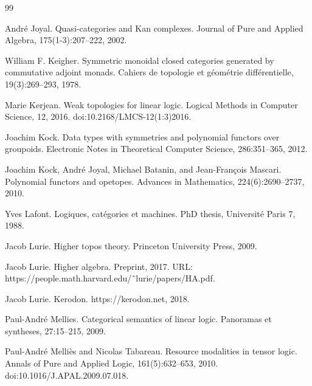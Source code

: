 \documentclass[10pt,a4paper]{article}
\begin{document}
\begin{thebibliography}{99}
\par\noindent    André Joyal.  Quasi-categories and Kan complexes.  Journal of Pure and Applied Algebra, 175(1-3):207–222, 2002.  

\par\noindent    William F. Keigher.  Symmetric monoidal closed categories generated by commutative adjoint monads.  Cahiers de topologie et géométrie différentielle, 19(3):269–293, 1978.  

\par\noindent    Marie Kerjean.  Weak topologies for linear logic.  Logical Methods in Computer Science, 12, 2016.  doi:10.2168/LMCS-12(1:3)2016.  

\par\noindent    Joachim Kock.  Data types with symmetries and polynomial functors over groupoids.  Electronic Notes in Theoretical Computer Science, 286:351–365, 2012.  

\par\noindent    Joachim Kock, André Joyal, Michael Batanin, and Jean-François Mascari.  Polynomial functors and opetopes.  Advances in Mathematics, 224(6):2690–2737, 2010.  

\par\noindent    Yves Lafont.  Logiques, catégories et machines.  PhD thesis, Université Paris 7, 1988.  

\par\noindent    Jacob Lurie.  Higher topos theory.  Princeton University Press, 2009.  

\par\noindent    Jacob Lurie.  Higher algebra.  Preprint, 2017.  URL: https://people.math.harvard.edu/˜lurie/papers/HA.pdf.  

\par\noindent    Jacob Lurie.  Kerodon.  https://kerodon.net, 2018.  

\par\noindent    Paul-André Mellies.  Categorical semantics of linear logic.  Panoramas et syntheses, 27:15–215, 2009.  

\par\noindent    Paul-André Melliès and Nicolas Tabareau.  Resource modalities in tensor logic.  Annals of Pure and Applied Logic, 161(5):632–653, 2010.  doi:10.1016/J.APAL.2009.07.018.  


\end{thebibliography}
\end{document}
